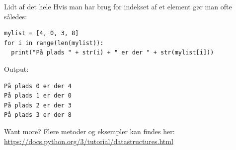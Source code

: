 \begin{frame}[fragile]{Lidt af det hele}
Hvis man har brug for indekset af et element gør man ofte således:
\begin{lstlisting}[style=python]
mylist = [4, 0, 3, 8]
for i in range(len(mylist)):
  print("På plads " + str(i) + " er der " + str(mylist[i]))
\end{lstlisting}
\pause

Output:
\begin{lstlisting}[style=python]
På plads 0 er der 4
På plads 1 er der 0
På plads 2 er der 3
På plads 3 er der 8
\end{lstlisting}
\end{frame}


\begin{frame}{Want more?}
	Flere metoder og eksempler kan findes her:\\
	\url{https://docs.python.org/3/tutorial/datastructures.html}
\end{frame}


